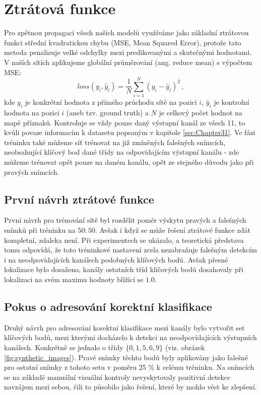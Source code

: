 \section{Ztrátová funkce}
\label{sec:Chapter47}
Pro zpětnou propagaci všech našich modelů využíváme jako základní ztrátovou funkci střední kvadratickou chybu (MSE, Mean Squared Error), protože tato metoda penalizuje velké odchylky mezi predikovanými a skutečnými hodnotami.  V naších sítích aplikujeme globální průměrování (ang. reduce mean) s výpočtem MSE:
\begin{equation}
    loss(y_i, \hat{y}_i) = \frac{1}{N} \sum_{i=1}^{N} (y_i - \hat{y}_i)^2 \,,
\end{equation}
kde $y_i$ je konkrétní hodnota z přímého průchodu sítě na pozici $i$, $\hat{y}_i$ je kontrolní hodnota na pozici $i$ (aneb tzv. ground truth) a $N$ je celkový počet hodnot na mapě příznaků. Kontroluje se vždy pouze daný výstupní kanál ze všech 11, to kvůli povaze informacím k datasetu popsaným v kapitole \ref{sec:Chapter31}. Ve fázi tréninku také můžeme síť trénovat na již zmíněných falešných snímcích, neobsahující klíčový bod dané třídy na odpovídajícím výstupní kanálu - zde můžeme trénovat opět pouze na daném kanálu, opět ze stejného důvodu jako při pravých snímcích.

\subsection{První návrh ztrátové funkce}

První návrh pro trénování sítě byl rozdělit poměr výskytu pravých a falešných snímků při tréninku na $50:50$. Avšak i když se může řešení ztrátové funkce zdát kompletní, zdaleka není. Při experimentech se ukázalo, a teoretická představa tomu odpovídá, že toto tréninkové nastavení zcela nezabraňuje falešným detekcím i na neodpovídajících kanálech podobných klíčových bodů. Avšak přesné lokalizace bylo dosaženo, kanály ostatních tříd klíčových bodů dosahovaly při lokalizaci na svém maximu hodnoty blížící se $1.0$.

\subsection{Pokus o adresování korektní klasifikace}

Druhý návrh pro adresování korektní klasifikace mezi kanály bylo vytvořit set klíčových bodů, mezi kterými docházelo k detekci na neodpovídajících výstupních kanálech. Konkrétně se jednalo o třídy $\{0, 1, 5, 6, 9\}$ (viz. obrázek \ref{fig:synthetic_images}). Pravé snímky těchto bodů byly aplikovány jako falešné pro ostatní snímky z tohoto setu v poměru 25 \% k celému tréninku. Na snímcích se na základě manuální vizuální kontroly nevyskytovaly pozitivní detekce navzájem mezi sebou, čili to působilo jako řešení, které by mohlo vést ke zlepšení.

